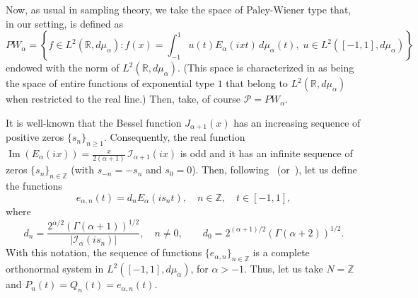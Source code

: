 \documentclass[11pt,a4paper]{amsart}
\theoremstyle{plain}
\theoremstyle{definition}
\newcommand{\Z}{\mathbb{Z}}
\newcommand{\R}{\mathbb{R}}
\newcommand{\calI}{\mathcal{I}}
\newcommand{\calP}{\mathcal{P}}
\begin{document}
Now, as usual in sampling theory, we take the space of Paley-Wiener type that,
in our setting, is defined as
\begin{equation}
\label{eq:PWa}
  PW_\alpha = \left\{ f\in L^2(\R,d\mu_\alpha):
  f(x) = \int_{-1}^{1} u(t)E_{\alpha}(ixt)\,d\mu_{\alpha}(t),\;
  u\in L^{2}([-1,1],d\mu_\alpha) \right\}
\end{equation}
endowed with the norm of $L^{2}(\R,d\mu_\alpha)$.
(This space is characterized in \cite[Theorem~5.1]{AJ} as being
the space of entire functions of exponential type $1$ that belong
to $L^2(\R,d\mu_\alpha)$ when restricted to the real line.) Then,
take, of course $\calP = PW_{\alpha}$.

It is well-known that the Bessel function $J_{\alpha+1}(x)$ has an
increasing sequence of positive zeros $\{s_n\}_{n\ge1}$.
Consequently, the real function
$\operatorname{Im}(E_{\alpha}(ix)) = \frac{x}{2(\alpha+1)}\,\calI_{\alpha+1}(ix)$
is odd and it has an infinite sequence of zeros $\{s_n\}_{n\in \Z}$
(with $s_{-n} = -s_n$ and $s_0 = 0$).
Then, following~\cite{CV} (or~\cite{CPRV}), let us define the functions
\begin{equation}
\label{eq:ean}
  e_{\alpha,n}(t) = d_n E_{\alpha}(is_n t),
  \quad n\in \Z, \quad t \in [-1,1],
\end{equation}
where
\begin{equation*}
  d_n = \frac{2^{\alpha/2}(\Gamma(\alpha+1))^{1/2}}
    {|\calI_{\alpha}(is_n)|}, \quad n \ne 0,
  \qquad
  d_0 = 2^{(\alpha+1)/2}(\Gamma(\alpha+2))^{1/2}.
\end{equation*}
With this notation, the sequence of functions
$\{e_{\alpha,n}\}_{n\in \Z}$
is a complete orthonormal system in $L^2([-1,1],d\mu_{\alpha})$, for $\alpha>-1$.
Thus, let us take $N = \Z$ and
$P_{n}(t) = Q_n(t) = e_{\alpha,n}(t)$.
\end{document}
